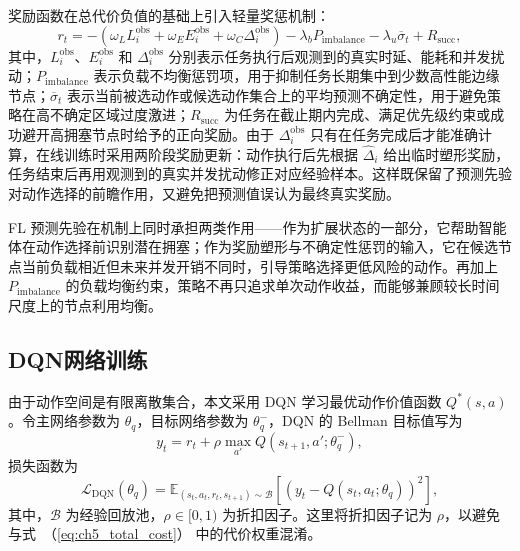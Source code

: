 奖励函数在总代价负值的基础上引入轻量奖惩机制：
\begin{equation}
    r_t = -\left(
    \omega_L L_i^{\mathrm{obs}}
    + \omega_E E_i^{\mathrm{obs}}
    + \omega_C \Delta_i^{\mathrm{obs}}
    \right)
    - \lambda_b P_{\mathrm{imbalance}}
    - \lambda_u \overline{\sigma}_t
    + R_{\mathrm{succ}},
    \label{eq:ch5_reward}
\end{equation}
其中，$L_i^{\mathrm{obs}}$、$E_i^{\mathrm{obs}}$ 和 $\Delta_i^{\mathrm{obs}}$ 分别表示任务执行后观测到的真实时延、能耗和并发扰动；$P_{\mathrm{imbalance}}$ 表示负载不均衡惩罚项，用于抑制任务长期集中到少数高性能边缘节点；$\overline{\sigma}_t$ 表示当前被选动作或候选动作集合上的平均预测不确定性，用于避免策略在高不确定区域过度激进；$R_{\mathrm{succ}}$ 为任务在截止期内完成、满足优先级约束或成功避开高拥塞节点时给予的正向奖励。由于 $\Delta_i^{\mathrm{obs}}$ 只有在任务完成后才能准确计算，在线训练时采用两阶段奖励更新：动作执行后先根据 $\widehat{\Delta}_i$ 给出临时塑形奖励，任务结束后再用观测到的真实并发扰动修正对应经验样本。这样既保留了预测先验对动作选择的前瞻作用，又避免把预测值误认为最终真实奖励。

FL 预测先验在机制上同时承担两类作用——作为扩展状态的一部分，它帮助智能体在动作选择前识别潜在拥塞；作为奖励塑形与不确定性惩罚的输入，它在候选节点当前负载相近但未来并发开销不同时，引导策略选择更低风险的动作。再加上 $P_{\mathrm{imbalance}}$ 的负载均衡约束，策略不再只追求单次动作收益，而能够兼顾较长时间尺度上的节点利用均衡。

\subsection{DQN网络训练}

由于动作空间是有限离散集合，本文采用 DQN 学习最优动作价值函数 $Q^*(s,a)$。令主网络参数为 $\theta_q$，目标网络参数为 $\theta_q^{-}$，DQN 的 Bellman 目标值写为
\begin{equation}
    y_t =
    r_t + \rho \max_{a'} Q(s_{t+1},a';\theta_q^-),
    \label{eq:ch5_bellman_target}
\end{equation}
损失函数为
\begin{equation}
    \mathcal{L}_{\mathrm{DQN}}(\theta_q) =
    \mathbb{E}_{(s_t,a_t,r_t,s_{t+1}) \sim \mathcal{B}}
    \left[
        \left(
        y_t - Q(s_t,a_t;\theta_q)
        \right)^2
        \right],
    \label{eq:ch5_dqn_loss}
\end{equation}
其中，$\mathcal{B}$ 为经验回放池，$\rho\in[0,1)$ 为折扣因子。这里将折扣因子记为 $\rho$，以避免与式~（\ref{eq:ch5_total_cost}） 中的代价权重混淆。

